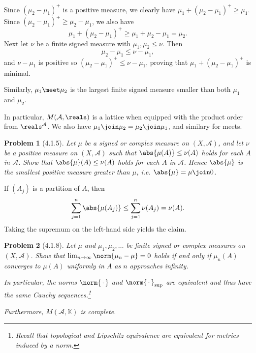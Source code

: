 \documentclass[a4paper, 11pt]{memoir}
\theoremstyle{plaincustomnumber}
\newtheorem{problem}{Problem}
\theoremstyle{changedotbreakcustomnumber}
\newcommand{\calA}{\mathcal{A}}
\newcommand{\fieldK}{\mathbb{K}}
\begin{document}
\begin{solution}
\begin{solutionsec}
    \item Since $(\mu_2 - \mu_1)^+$ is a positive measure, we clearly have $\mu_1 + (\mu_2 - \mu_1)^+ \geq \mu_1$. Since $(\mu_2 - \mu_1)^+ \geq \mu_2 - \mu_1$, we also have
    \begin{equation*}
        \mu_1 + (\mu_2 - \mu_1)^+
            \geq \mu_1 + \mu_2 - \mu_1
            = \mu_2.
    \end{equation*}
    Next let $\nu$ be a finite signed measure with $\mu_1,\mu_2 \leq \nu$. Then
    \begin{equation*}
        \mu_2 - \mu_1
            \leq \nu - \mu_1,
    \end{equation*}
    and $\nu - \mu_1$ is positive so $(\mu_2 - \mu_1)^+ \leq \nu - \mu_1$, proving that $\mu_1 + (\mu_2 - \mu_1)^+$ is minimal.

    \item Similarly, $\mu_1 \meet \mu_2$ is the largest finite signed measure smaller than both $\mu_1$ and $\mu_2$.
\end{solutionsec}

In particular, $M(\calA,\reals)$ is a lattice when equipped with the product order from $\reals^\calA$. We also have $\mu_1 \join \mu_2 = \mu_2 \join \mu_1$, and similary for meets.
\end{solution}


\begin{problem}[4.1.5]
    Let $\mu$ be a signed or complex measure on $(X,\calA)$, and let $\nu$ be a positive measure on $(X,\calA)$ such that $\abs{\mu(A)} \leq \nu(A)$ holds for each $A$ in $\calA$. Show that $\abs{\mu}(A) \leq \nu(A)$ holds for each $A$ in $\calA$. Hence $\abs{\mu}$ is the smallest positive measure greater than $\mu$, i.e. $\abs{\mu} = \mu \join 0$.
\end{problem}

\begin{solution}
    If $(A_j)$ is a partition of $A$, then
    \begin{equation*}
        \sum_{j=1}^n \abs{\mu(A_j)}
            \leq \sum_{j=1}^n \nu(A_j)
            = \nu(A).
    \end{equation*}
    Taking the supremum on the left-hand side yields the claim.
\end{solution}


\begin{problem}[4.1.8]
    Let $\mu$ and $\mu_1, \mu_2, \ldots$ be finite signed or complex measures on $(X,\calA)$. Show that $\lim_{n \to \infty} \norm{\mu_n - \mu} = 0$ holds if and only if $\mu_n(A)$ converges to $\mu(A)$ uniformly in $A$ as $n$ approaches infinity.

    In particular, the norms $\norm{\,\cdot\,}$ and $\norm{\,\cdot\,}_{\sup}$ are equivalent and thus have the same Cauchy sequences.\footnote{Recall that topological and Lipschitz equivalence are equivalent for metrics induced by a norm.}
    
    Furthermore, $M(\calA,\fieldK)$ is complete.
\end{problem}
\end{document}
